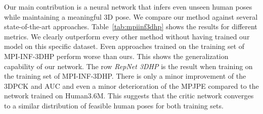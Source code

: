 \documentclass[10pt,twocolumn,letterpaper]{article}
\begin{document}
Our main contribution is a neural network that infers even unseen human poses while maintaining a meaningful 3D pose.
We compare our method against several state-of-the-art approaches.
Table~\ref{tab:mpiinf3dhp} shows the results for different metrics.
We clearly outperform every other method without having trained our model on this specific dataset.
Even approaches trained on the training set of MPI-INF-3DHP perform worse than ours.
This shows the generalization capability of our network.
The row \textit{RepNet 3DHP} is the result when training on the training set of MPI-INF-3DHP.
There is only a minor improvement of the 3DPCK and AUC and even a minor deterioration of the MPJPE compared to the network trained on Human3.6M.
This suggests that the critic network converges to a similar distribution of feasible human poses for both training sets.
\end{document}
